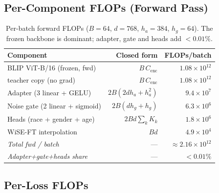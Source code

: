 \subsection{Per-Component FLOPs (Forward Pass)}

\begin{table}[htbp]
\centering
\caption{Per-batch forward FLOPs ($B{=}64$, $d{=}768$, $h_a{=}384$, $h_g{=}64$). The frozen backbone is dominant; adapter, gate and heads add ${<}0.01\%$.}
\label{tab:flop_components}
\small
\setlength{\tabcolsep}{4pt}
\begin{tabular}{lrr}
\toprule
Component & Closed form & FLOPs/batch \\
\midrule
BLIP ViT-B/16 (frozen, fwd) & $B\,C_{\text{enc}}$ & $1.08{\times}10^{12}$ \\
\quad teacher copy (no grad) & $B\,C_{\text{enc}}$ & $1.08{\times}10^{12}$ \\
Adapter (3 linear + GELU)   & $2B(2 d h_a + h_a^2)$ & $9.4{\times}10^{7}$ \\
Noise gate (2 linear + sigmoid) & $2B(d h_g + h_g)$ & $6.3{\times}10^{6}$ \\
Heads (race + gender + age) & $2B d \sum_k K_k$ & $1.8{\times}10^{6}$ \\
WiSE-FT interpolation       & $B d$ & $4.9{\times}10^{4}$ \\
\midrule
\textit{Total fwd / batch}  & --- & $\approx 2.16{\times}10^{12}$ \\
\textit{Adapter+gate+heads share} & --- & $\mathbf{<\!0.01\%}$ \\
\bottomrule
\end{tabular}
\end{table}

\subsection{Per-Loss FLOPs}

